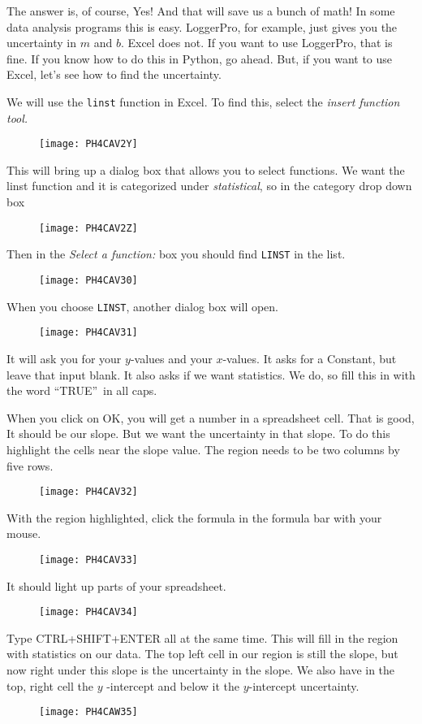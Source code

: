 The answer is, of course, Yes! And that will save us a bunch of math! In
some data analysis programs this is easy. LoggerPro, for example, just gives
you the uncertainty in $m$ and $b.$ Excel does not. If you want to use
LoggerPro, that is fine. If you know how to do this in Python, go ahead.
But, if you want to use Excel, let's see how to find the uncertainty.

We will use the \texttt{linst} function in Excel. To find this, select the 
\emph{insert function tool.}

\begin{figure}[h!]
	\texttt{[image: PH4CAV2Y]}
\end{figure}This will bring up a dialog box
that allows you to select functions. We want the linst function and it is
categorized under \emph{statistical}, so in the category drop down box 
\begin{figure}[h!]
	\texttt{[image: PH4CAV2Z]}
\end{figure}Then in the \emph{Select a
	function:} box you should find \texttt{LINST} in the list.\begin{figure}[h!]
	\texttt{[image: PH4CAV30]}
\end{figure}%
When you choose \texttt{LINST}, another dialog box will open.\begin{figure}[h!]
	\texttt{[image: PH4CAV31]}
\end{figure}
It will ask you for your $y$-values and your $x$-values. It asks for a
Constant, but leave that input blank. It also asks if we want statistics. We
do, so fill this in with the word \textquotedblleft TRUE\textquotedblright\
in all caps.

When you click on OK, you will get a number in a spreadsheet cell. That is
good, It should be our slope. But we want the uncertainty in that slope. To
do this highlight the cells near the slope value. The region needs to be two
columns by five rows. \begin{figure}[h!]
	\texttt{[image: PH4CAV32]}
\end{figure}With the region highlighted,
click the formula in the formula bar with your mouse.\begin{figure}[h!]
	\texttt{[image: PH4CAV33]}
\end{figure} It should light up parts of your
spreadsheet. \begin{figure}[h!]
	\texttt{[image: PH4CAV34]}
\end{figure}Type CTRL+SHIFT+ENTER all at the
same time. This will fill in the region with statistics on our data. The top
left cell in our region is still the slope, but now right under this slope
is the uncertainty in the slope. We also have in the top, right cell the $y$%
-intercept and below it the $y$-intercept uncertainty. \begin{figure}[h!]
	\texttt{[image: PH4CAW35]}
\end{figure}


